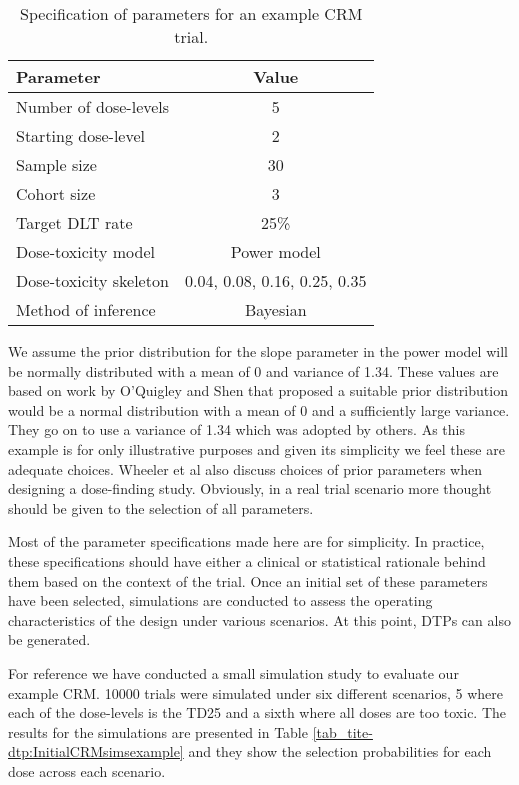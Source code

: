 \begin{table}[h!]
	\centering
	\caption{Specification of parameters for an example CRM trial. }
	\label{tab_tite-dtp:exampleCRMspecs}
	\begin{tabular}{l|c}
		\hline
		\textbf{Parameter}     & \textbf{Value}               \\ \hline
		Number of dose-levels  & 5                            \\
		Starting dose-level    & 2                            \\
		Sample size            & 30                           \\
		Cohort size            & 3                            \\
		Target DLT rate        & 25\%                         \\
		Dose-toxicity model    & Power model                  \\
		Dose-toxicity skeleton & 0.04, 0.08, 0.16, 0.25, 0.35 \\
		Method of inference    & Bayesian                     \\ \hline
	\end{tabular}
\end{table}

We assume the prior distribution for the slope parameter in the power model will be normally distributed with a mean of 0 and variance of 1.34. These values are based on work by O'Quigley and Shen \cite{oquigleyContinualReassessmentMethod1996} that proposed a suitable prior distribution would be a normal distribution with a mean of 0 and a sufficiently large variance. They go on to use a variance of 1.34 which was adopted by others. As this example is for only illustrative purposes and given its simplicity we feel these are adequate choices. Wheeler et al \cite{wheelerHowDesignDosefinding2019} also discuss choices of prior parameters when designing a dose-finding study. Obviously, in a real trial scenario more thought should be given to the selection of all parameters. 

Most of the parameter specifications made here are for simplicity. In practice, these specifications should have either a clinical or statistical rationale behind them based on the context of the trial. Once an initial set of these parameters have been selected, simulations are conducted to assess the operating characteristics of the design under various scenarios. At this point, DTPs can also be generated. 

For reference we have conducted a small simulation study to evaluate our example CRM. 10000 trials were simulated under six different scenarios, 5 where each of the dose-levels is the TD25 and a sixth where all doses are too toxic. The results for the simulations are presented in Table \ref{tab_tite-dtp:InitialCRMsimsexample} and they show the selection probabilities for each dose across each scenario. 

